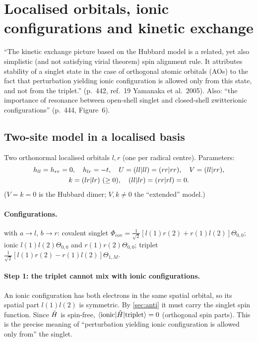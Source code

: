\section{Localised orbitals, ionic configurations and kinetic exchange}\label{sec:kinex}

\begin{reviewclaim}
``The kinetic exchange picture based on the Hubbard model is a related, yet also simplistic (and not
satisfying virial theorem) spin alignment rule. It attributes stability of a singlet state in the case
of orthogonal atomic orbitals (AOs) to the fact that perturbation yielding ionic configuration is
allowed only from this state, and not from the triplet.'' (p.~442, ref.~19 Yamanaka et al.\ 2005).
Also: ``the importance of resonance between open-shell singlet and closed-shell zwitterionic
configurations'' (p.~444, Figure~6).
\end{reviewclaim}

\subsection{Two-site model in a localised basis}
Two orthonormal localised orbitals $l,r$ (one per radical centre). Parameters:
\begin{gather}
  h_{ll}=h_{rr}=0,\quad h_{lr}=-t,\quad U=(ll\vert ll)=(rr\vert rr),\quad V=(ll\vert rr),\\
  k=(lr\vert lr)\ (\ge0),\quad (ll\vert lr)=(rr\vert rl)=0 .
\end{gather}
($V=k=0$ is the Hubbard dimer; $V,k\neq0$ the ``extended'' model.)

\paragraph{Configurations.}  with $a\to l$, $b\to r$: covalent singlet
$\Phi_{\text{cov}}=\tfrac1{\sqrt2}[l(1)r(2)+r(1)l(2)]\Theta_{0,0}$; ionic $l(1)l(2)\Theta_{0,0}$ and $r(1)r(2)\Theta_{0,0}$;
triplet $\tfrac1{\sqrt2}[l(1)r(2)-r(1)l(2)]\Theta_{1,M}$.

\paragraph{Step 1: the triplet cannot mix with ionic configurations.} An ionic configuration has both
electrons in the same spatial orbital, so its spatial part $l(1)l(2)$ is symmetric. By \cref{sec:anti} it
must carry the singlet spin function. Since $\hat H$ is spin-free, $\langle \text{ionic}\vert \hat H\vert \text{triplet}\rangle=0$
(orthogonal spin parts). This is the precise meaning of ``perturbation yielding ionic configuration is
allowed only from'' the singlet.

